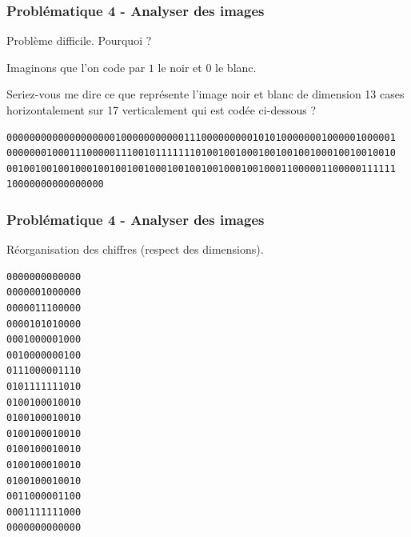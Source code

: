 
\begin{frame}[fragile]
	\frametitle{Problématique 4 - Analyser des images}
	
	Problème difficile.
	\pause
	Pourquoi ?
	
	\pause
	
	\medskip 
	
	Imaginons que l'on code par $1$ le noir et $0$ le blanc.
	
	\pause
	
	\medskip 
	
	Seriez-vous me dire ce que représente l'image noir et blanc de dimension 13 \og{}cases\fg{} horizontalement sur 17 verticalement qui est codée ci-dessous ? 
	
	\begin{center}
		\scriptsize
		\begin{verbatim}
00000000000000000001000000000001110000000001010100000001000001000001
00000001000111000001110010111111101001001000100100100100010010010010
00100100100100010010010010001001001001000100100011000001100000111111
10000000000000000
		\end{verbatim}
	\end{center}
\end{frame}



\begin{frame}[fragile]
	\frametitle{Problématique 4 - Analyser des images}
	
	Réorganisation des chiffres (respect des dimensions).
	
	\begin{center}
		\scriptsize
		\begin{verbatim}
0000000000000
0000001000000
0000011100000
0000101010000
0001000001000
0010000000100
0111000001110
0101111111010
0100100010010
0100100010010
0100100010010
0100100010010
0100100010010
0100100010010
0011000001100
0001111111000
0000000000000
		\end{verbatim}
	\end{center}
\end{frame}



